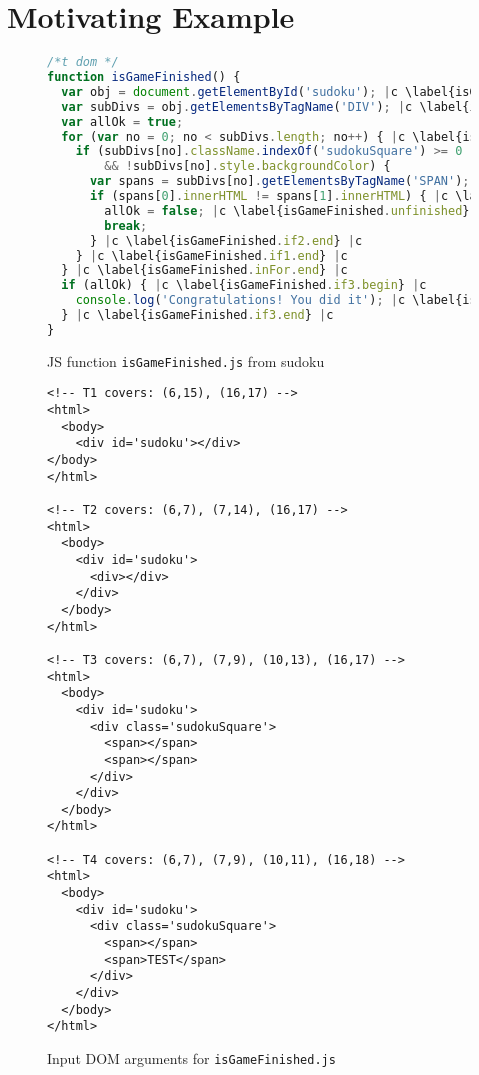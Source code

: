 \documentclass[sigconf]{acmart}
\begin{document}
\section{Motivating Example}
\label{sec.example}

\begin{figure}[t]
  \begin{lstlisting}[style=htmlcssjs,language=JavaScript]
/*t dom */
function isGameFinished() {
  var obj = document.getElementById('sudoku'); |c \label{isGameFinished.getSudoku} |c
  var subDivs = obj.getElementsByTagName('DIV'); |c \label{isGameFinished.getDivs} |c
  var allOk = true;
  for (var no = 0; no < subDivs.length; no++) { |c \label{isGameFinished.inFor.begin} |c
    if (subDivs[no].className.indexOf('sudokuSquare') >= 0 |c \label{isGameFinished.if1.begin} |c 
        && !subDivs[no].style.backgroundColor) { 
      var spans = subDivs[no].getElementsByTagName('SPAN');
      if (spans[0].innerHTML != spans[1].innerHTML) { |c \label{isGameFinished.if2.begin} |c
        allOk = false; |c \label{isGameFinished.unfinished} |c
        break;
      } |c \label{isGameFinished.if2.end} |c
    } |c \label{isGameFinished.if1.end} |c
  } |c \label{isGameFinished.inFor.end} |c
  if (allOk) { |c \label{isGameFinished.if3.begin} |c 
    console.log('Congratulations! You did it'); |c \label{isGameFinished.finished} |c
  } |c \label{isGameFinished.if3.end} |c
}
\end{lstlisting}
  \caption{JS function \texttt{isGameFinished.js} from sudoku}
  \label{code.newGame}

\end{figure}

\begin{figure}[t]
  \begin{lstlisting}[style=htmlcssjs, language=HTML5]
<!-- T1 covers: (6,15), (16,17) -->
<html>
  <body>
    <div id='sudoku'></div>
</body>
</html>

<!-- T2 covers: (6,7), (7,14), (16,17) -->
<html>
  <body>
    <div id='sudoku'>
      <div></div>
    </div>
  </body>
</html>

<!-- T3 covers: (6,7), (7,9), (10,13), (16,17) -->
<html>
  <body>
    <div id='sudoku'>
      <div class='sudokuSquare'>
        <span></span>
        <span></span>
      </div>
    </div>
  </body>
</html>

<!-- T4 covers: (6,7), (7,9), (10,11), (16,18) -->
<html>
  <body>
    <div id='sudoku'>
      <div class='sudokuSquare'>
        <span></span>
        <span>TEST</span>
      </div>
    </div>
  </body>
</html>
  \end{lstlisting}
  \caption{Input DOM arguments for \texttt{isGameFinished.js}}
  \label{fig.isGameFinished.tests}
\end{figure}
\end{document}
